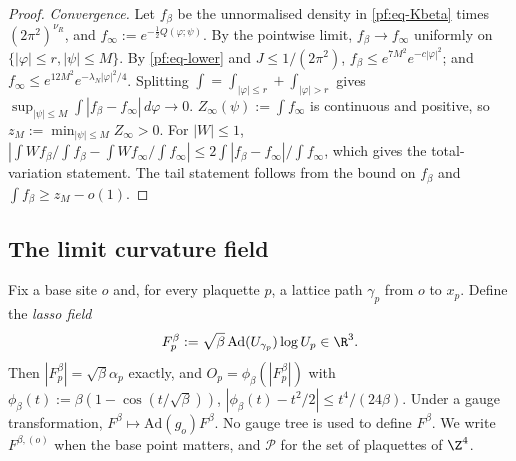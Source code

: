 \begin{proof}
\emph{Convergence.} Let $f_\beta$ be the unnormalised density in \eqref{pf:eq-Kbeta} times $(2\pi^2)^{\nu_R}$, and $f_\infty:=e^{-\frac12Q(\varphi;\psi)}$. By the pointwise limit, $f_\beta\to f_\infty$ uniformly on $\{|\varphi|\le r,|\psi|\le M\}$. By \eqref{pf:eq-lower} and $J\le1/(2\pi^2)$, $f_\beta\le e^{7M^2}e^{-c|\varphi|^2}$; and $f_\infty\le e^{12M^2}e^{-\lambda_N|\varphi|^2/4}$. Splitting $\int=\int_{|\varphi|\le r}+\int_{|\varphi|>r}$ gives $\sup_{|\psi|\le M}\int|f_\beta-f_\infty|\,d\varphi\to0$. $Z_\infty(\psi):=\int f_\infty$ is continuous and positive, so $z_M:=\min_{|\psi|\le M}Z_\infty>0$. For $|W|\le1$, $|\int Wf_\beta/\int f_\beta-\int Wf_\infty/\int f_\infty|\le2\int|f_\beta-f_\infty|/\int f_\infty$, which gives the total-variation statement. The tail statement follows from the bound on $f_\beta$ and $\int f_\beta\ge z_M-o(1)$.
\end{proof}

\subsection{The limit curvature field}\label{pf:sec-L4}

Fix a base site $o$ and, for every plaquette $p$, a lattice path $\gamma_p$ from $o$ to $x_p$. Define the \emph{lasso field}
\[
F^\beta_p:=\sqrt\beta\,\mathrm{Ad}(U_{\gamma_p})\log U_p\in\R^3 .
\]
Then $|F^\beta_p|=\sqrt\beta\alpha_p$ exactly, and $O_p=\phi_\beta(|F^\beta_p|)$ with $\phi_\beta(t):=\beta(1-\cos(t/\sqrt\beta))$, $|\phi_\beta(t)-t^2/2|\le t^4/(24\beta)$. Under a gauge transformation, $F^\beta\mapsto\mathrm{Ad}(g_o)F^\beta$. No gauge tree is used to define $F^\beta$. We write $F^{\beta,(o)}$ when the base point matters, and $\mathcal P$ for the set of plaquettes of $\Z^4$.

